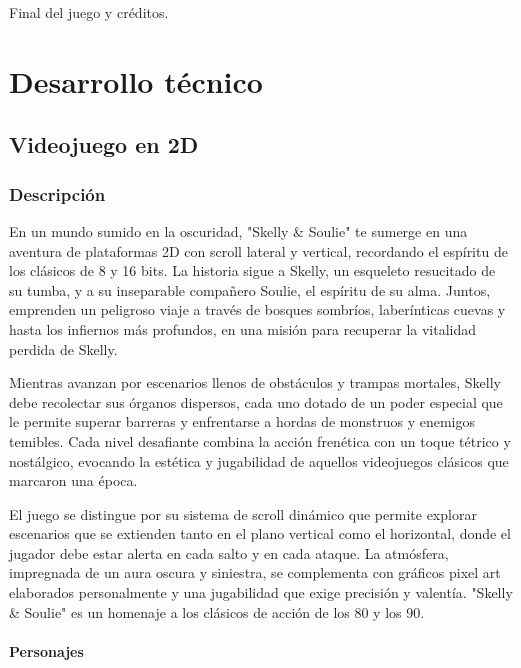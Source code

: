 \documentclass[12pt,a4paper,twoside,spanish]{article}      %
\begin{document}
Final del juego y créditos.

\clearpage

\section{Desarrollo técnico}

\subsection{Videojuego en 2D}

\subsubsection{Descripción}

En un mundo sumido en la oscuridad, "Skelly \& Soulie" te sumerge en una aventura de plataformas 2D con scroll lateral y vertical, recordando el espíritu de los clásicos de 8 y 16 bits. La historia sigue a Skelly, un esqueleto resucitado de su tumba, y a su inseparable compañero Soulie, el espíritu de su alma. Juntos, emprenden un peligroso viaje a través de bosques sombríos, laberínticas cuevas y hasta los infiernos más profundos, en una misión para recuperar la vitalidad perdida de Skelly.\

Mientras avanzan por escenarios llenos de obstáculos y trampas mortales, Skelly debe recolectar sus órganos dispersos, cada uno dotado de un poder especial que le permite superar barreras y enfrentarse a hordas de monstruos y enemigos temibles. Cada nivel desafiante combina la acción frenética con un toque tétrico y nostálgico, evocando la estética y jugabilidad de aquellos videojuegos clásicos que marcaron una época.\

El juego se distingue por su sistema de scroll dinámico que permite explorar escenarios que se extienden tanto en el plano vertical como el horizontal, donde el jugador debe estar alerta en cada salto y en cada ataque. La atmósfera, impregnada de un aura oscura y siniestra, se complementa con gráficos pixel art elaborados personalmente y una jugabilidad que exige precisión y valentía. "Skelly \& Soulie" es un homenaje a los clásicos de acción de los 80 y los 90.\

\paragraph{Personajes}
\end{document}

